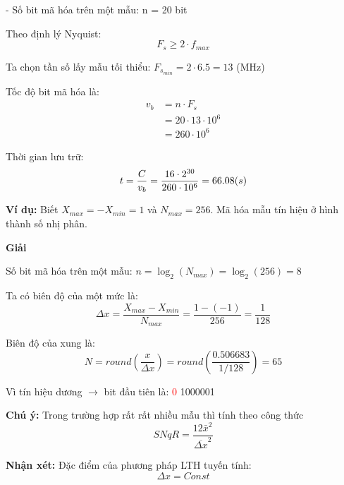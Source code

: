 \hspace*{0.5cm}- Số bit mã hóa trên một mẫu: n = 20 bit

\vspace{0.5cm}

Theo định lý Nyquist:
\[
    F_s \geq 2 \cdot f_{max}
\]

Ta chọn tần số lấy mẫu tối thiểu: $F_{s_{min}} = 2 \cdot 6.5 = 13$ (MHz)

Tốc độ bit mã hóa là: 
\[
    \begin{aligned}
        v_b &= n \cdot F_s\\[6pt]
            &= 20 \cdot 13 \cdot 10^6\\[6pt]
            &= 260 \cdot 10^6
    \end{aligned}
\]

Thời gian lưu trữ:
\[
    t = \dfrac{C}{v_b}\\[6pt] = \dfrac{16 \cdot 2^{30}}{260 \cdot 10^6}\\[6pt] = 66.08 (s)
\]

\newpage

\noindent\textbf{Ví dụ:} Biết $X_{max} = -X_{min} = 1$ và $N_{max} = 256$. Mã hóa mẫu tín hiệu ở hình thành số nhị phân.

\begin{center}
    
\end{center}

\begin{center}
    \textbf{Giải}
\end{center}

Số bit mã hóa trên một mẫu: $n = \log_2(N_{max}) = \log_2(256) = 8$

Ta có biên độ của một mức là: 
\[
    \Delta x = \dfrac{X_{max} - X_{min}}{N_{max}} = \dfrac{1 - (-1)}{256} = \dfrac{1}{128}
\]

Biên độ của xung là: 
\[
    N = round\left(\dfrac{x}{\Delta x}\right) = round\left(\dfrac{0.506683}{1/128}\right) = 65
\]

Vì tín hiệu dương $\rightarrow$ bit đầu tiên là: \textcolor{red}{0} 1000001

\vspace{0.5cm}

\noindent\textbf{Chú ý:} Trong trường hợp rất rất nhiều mẫu thì tính theo công thức
\[
    \boxed{SNqR = \dfrac{12 \bar{x}^2}{\overline{\Delta x}^2}}
\]

\vspace{1cm}

\noindent\textbf{Nhận xét:} Đặc điểm của phương pháp LTH tuyến tính:
\[
    \Delta x = Const
\]

